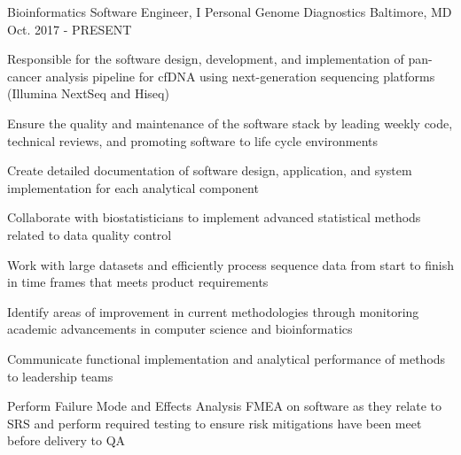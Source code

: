 

\begin{cventries}

  \cventry
    {Bioinformatics Software Engineer, I} %
    {Personal Genome Diagnostics} %
    {Baltimore, MD} %
    {Oct. 2017 - PRESENT} %
    {
      \begin{cvitems} %
        \item{Responsible for the software design, development, and implementation of pan-cancer analysis pipeline for cfDNA using next-generation sequencing platforms (Illumina NextSeq and Hiseq)}
        \item{Ensure the quality and maintenance of the software stack by leading weekly code, technical reviews, and promoting software to life cycle environments}
        \item{Create detailed documentation of software design, application, and system implementation for each analytical component}
        \item{Collaborate with biostatisticians to implement advanced statistical methods related to data quality control}
        \item{Work with large datasets and efficiently process sequence data from start to finish in time frames that meets product requirements}
        \item{Identify areas of improvement in current methodologies through monitoring academic advancements in computer science and bioinformatics}
        \item{Communicate functional implementation and analytical performance of methods to leadership teams}
        \item{Perform Failure Mode and Effects Analysis FMEA on software as they relate to SRS and perform required testing to ensure risk mitigations have been meet before delivery to QA}
      \end{cvitems}
    }


\end{cventries}
